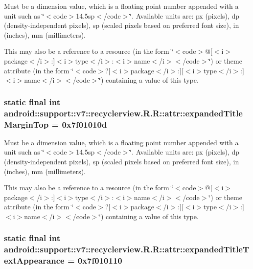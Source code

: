 Must be a dimension value, which is a floating point number appended with a unit such as \char`\"{}$<$code$>$14.5sp$<$/code$>$\char`\"{}. Available units are: px (pixels), dp (density-independent pixels), sp (scaled pixels based on preferred font size), in (inches), mm (millimeters). 

This may also be a reference to a resource (in the form \char`\"{}$<$code$>$@\mbox{[}$<$i$>$package$<$/i$>$:\mbox{]}$<$i$>$type$<$/i$>$:$<$i$>$name$<$/i$>$$<$/code$>$\char`\"{}) or theme attribute (in the form \char`\"{}$<$code$>$?\mbox{[}$<$i$>$package$<$/i$>$:\mbox{]}\mbox{[}$<$i$>$type$<$/i$>$:\mbox{]}$<$i$>$name$<$/i$>$$<$/code$>$\char`\"{}) containing a value of this type. \hypertarget{classandroid_1_1support_1_1v7_1_1recyclerview_1_1_r_1_1attr_d81d65065369514e481528f534dfc4c6}{
\subsubsection[{expandedTitleMarginTop}]{\setlength{\rightskip}{0pt plus 5cm}static final int android::support::v7::recyclerview.R.R::attr::expandedTitleMarginTop = 0x7f01010d}}
\label{classandroid_1_1support_1_1v7_1_1recyclerview_1_1_r_1_1attr_d81d65065369514e481528f534dfc4c6}


Must be a dimension value, which is a floating point number appended with a unit such as \char`\"{}$<$code$>$14.5sp$<$/code$>$\char`\"{}. Available units are: px (pixels), dp (density-independent pixels), sp (scaled pixels based on preferred font size), in (inches), mm (millimeters). 

This may also be a reference to a resource (in the form \char`\"{}$<$code$>$@\mbox{[}$<$i$>$package$<$/i$>$:\mbox{]}$<$i$>$type$<$/i$>$:$<$i$>$name$<$/i$>$$<$/code$>$\char`\"{}) or theme attribute (in the form \char`\"{}$<$code$>$?\mbox{[}$<$i$>$package$<$/i$>$:\mbox{]}\mbox{[}$<$i$>$type$<$/i$>$:\mbox{]}$<$i$>$name$<$/i$>$$<$/code$>$\char`\"{}) containing a value of this type. \hypertarget{classandroid_1_1support_1_1v7_1_1recyclerview_1_1_r_1_1attr_2c54c0bf76aab362b45958a9e2afa61a}{
\subsubsection[{expandedTitleTextAppearance}]{\setlength{\rightskip}{0pt plus 5cm}static final int android::support::v7::recyclerview.R.R::attr::expandedTitleTextAppearance = 0x7f010110}}
\label{classandroid_1_1support_1_1v7_1_1recyclerview_1_1_r_1_1attr_2c54c0bf76aab362b45958a9e2afa61a}


